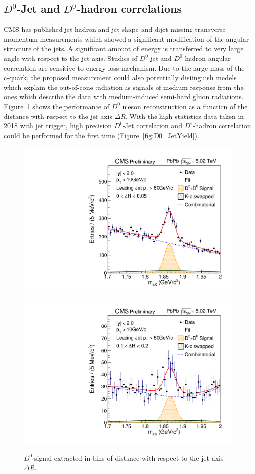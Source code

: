 \subsection{$D^0$-Jet and $D^0$-hadron correlations}

CMS has published jet-hadron and jet shape and dijet missing transverse momentum measurements which showed a significant modification of the angular structure of the jets. A significant amount of energy is transferred to very large angle with respect to the jet axis. Studies of $D^0$-jet and $D^0$-hadron angular correlation are sensitive to energy loss mechanism. Due to the large mass of the c-quark, the proposed measurement could also potentially distinguish models which explain the out-of-cone radiation as signals of medium response from the ones which describe the data with medium-induced semi-hard gluon radiations. Figure~\ref{fig:D0_Jet} shows the performance of $D^0$ meson reconstruction as a function of the distance with respect to the jet axis $\Delta R$. With the high statistics data taken in 2018 with jet trigger, high precision $D^0$-Jet correlation and $D^0$-hadron correlation could be performed for the first time (Figure~\ref{fig:D0_JetYield}).

\begin{figure}[!ht]
\begin{center}
\includegraphics[width=.49\textwidth]{DJetPlots/fhHistoMass_R0.pdf}
\includegraphics[width=.49\textwidth]{DJetPlots/fhHistoMass_R2.pdf}
\caption{$D^0$ signal extracted in bins of distance with respect to the jet axis $\Delta R$. }
\label{fig:D0_Jet}
\end{center}
\end{figure}

